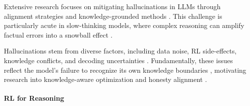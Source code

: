 
Extensive research focuses on mitigating hallucinations in LLMs through alignment strategies and knowledge-grounded methods \citep{cheng2025inverse, kang2025unfamiliar, wen2025policy, xu2024rejection, lireasoning, lin2024flame, sun2025detection, liang2024learning, ding2024sail, xu2025doubly, tang2024understanding, han2024value, xu2024dpo, yin2025reasoning, yuan2023rrhf, chen2024honest, zhang2024truthx, dhuliawala2024chain, feng2024don, liu2025know3, martino2023knowledge}. This challenge is particularly acute in slow-thinking models, where complex reasoning can amplify factual errors into a snowball effect \citep{ji2023survey, huang2025survey, zhang2023language, cheng2025think, yao2025reasoning, zheng2025enhancing, zhang2025scaling}.

Hallucinations stem from diverse factors, including data noise, RL side-effects, knowledge conflicts, and decoding uncertainties \citep{mundler2023self, song2025hallucination, ouyang2022training, zhang2024knowledge, zhang2025law, kuhn2023semantic, zhao2024awecita}.
Fundamentally, these issues reflect the model's failure to recognize its own knowledge boundaries \citep{zhang2023user, tonmoy2024comprehensive, liang2024learning, manakul2023selfcheckgpt, kadavath2022language}, motivating research into knowledge-aware optimization and honesty alignment \citep{chen2022knowprompt, chen2023large, yang2024alignment}.

\paragraph{RL for Reasoning}


